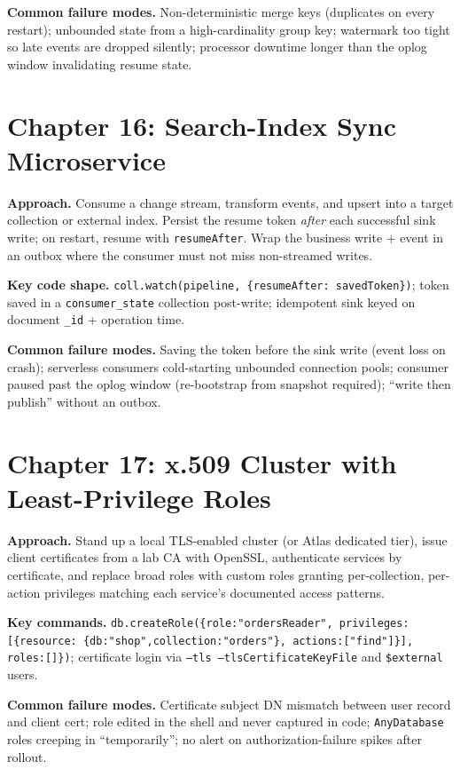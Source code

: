 \textbf{Common failure modes.} Non-deterministic merge keys (duplicates on every restart);
unbounded state from a high-cardinality group key; watermark too tight so late events are
dropped silently; processor downtime longer than the oplog window invalidating resume state.

\section{Chapter 16: Search-Index Sync Microservice}
\textbf{Approach.} Consume a change stream, transform events, and upsert into a target
collection or external index. Persist the resume token \emph{after} each successful sink write;
on restart, resume with \texttt{resumeAfter}. Wrap the business write + event in an outbox where
the consumer must not miss non-streamed writes.

\textbf{Key code shape.} \texttt{coll.watch(pipeline, \{resumeAfter: savedToken\})}; token saved
in a \texttt{consumer\_state} collection post-write; idempotent sink keyed on document
\texttt{\_id} + operation time.

\textbf{Common failure modes.} Saving the token before the sink write (event loss on crash);
serverless consumers cold-starting unbounded connection pools; consumer paused past the oplog
window (re-bootstrap from snapshot required); ``write then publish'' without an outbox.

\section{Chapter 17: x.509 Cluster with Least-Privilege Roles}
\textbf{Approach.} Stand up a local TLS-enabled cluster (or Atlas dedicated tier), issue client
certificates from a lab CA with OpenSSL, authenticate services by certificate, and replace broad
roles with custom roles granting per-collection, per-action privileges matching each service's
documented access patterns.

\textbf{Key commands.} \texttt{db.createRole(\{role:"ordersReader", privileges:[\{resource:
\{db:"shop",collection:"orders"\}, actions:["find"]\}], roles:[]\})}; certificate login via
\texttt{--tls --tlsCertificateKeyFile} and \texttt{\$external} users.

\textbf{Common failure modes.} Certificate subject DN mismatch between user record and client
cert; role edited in the shell and never captured in code; \texttt{AnyDatabase} roles creeping in
``temporarily''; no alert on authorization-failure spikes after rollout.

